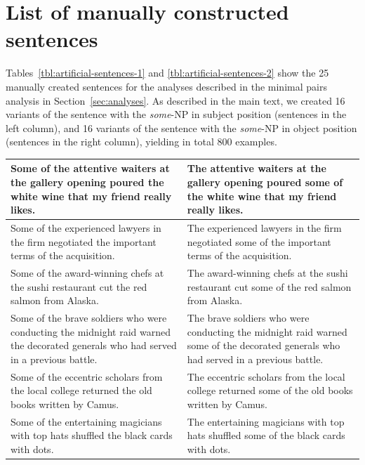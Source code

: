 \documentclass[11pt,a4paper]{article}
\newcommand{\sectionref}[1]{Section~\ref{#1}}
\begin{document}
\clearpage

\section{List of manually constructed sentences}
\label{app:sentences}
Tables~\ref{tbl:artificial-sentences-1} and \ref{tbl:artificial-sentences-2} show the 25 manually created sentences for the analyses described in the minimal pairs analysis in \sectionref{sec:analyses}. As described in the main text, we created 16 variants of the sentence with the \emph{some}-NP in subject position (sentences in the left column), and 16 variants of the sentence with the \emph{some}-NP in object position (sentences in the right column), yielding in total 800 examples.




\begin{table}[h]
    \centering
    \begin{tabular}{|p{}|p{}|}
        \hline
        Some of the attentive waiters at the gallery opening poured the white wine that my friend really likes. & The attentive waiters at the gallery opening poured some of the white wine that my friend really likes.  \\
        \hline
        Some of the experienced lawyers in the firm negotiated the important terms of the acquisition. & The experienced lawyers in the firm negotiated some of the important terms of the acquisition. \\
        \hline
        Some of the award-winning chefs at the sushi restaurant cut the red salmon from Alaska. & The award-winning chefs at the sushi restaurant cut some of the red salmon from Alaska. \\
        \hline
        Some of the brave soldiers who were conducting the midnight raid warned the decorated generals who had served in a previous battle. & The brave soldiers who were conducting the midnight raid warned some of the decorated generals who had served in a previous battle. \\
        \hline
        Some of the eccentric scholars from the local college returned the old books written by Camus. & The eccentric scholars from the local college returned some of the old books written by Camus. \\
        \hline
        Some of the entertaining magicians with top hats shuffled the black cards with dots. & The entertaining magicians with top hats shuffled some of the black cards with dots. \\

\end{tabular}
\end{table}
\end{document}
